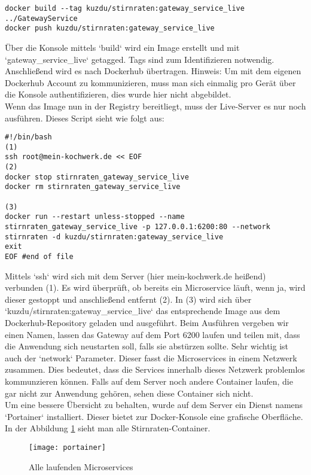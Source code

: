 \begin{verbatim}
docker build --tag kuzdu/stirnraten:gateway_service_live ../GatewayService
docker push kuzdu/stirnraten:gateway_service_live
\end{verbatim}

Über die Konsole mittels `build` wird ein Image erstellt und mit `gateway\_service\_live` getagged. Tags sind zum Identifizieren notwendig. Anschließend wird es nach Dockerhub übertragen. Hinweis: Um mit dem eigenen Dockerhub Account zu kommunizieren, muss man sich einmalig pro Gerät über die Konsole authentifizieren, dies wurde hier nicht abgebildet. \\

Wenn das Image nun in der Registry bereitliegt, muss der Live-Server es nur noch ausführen. Dieses Script sieht wie folgt aus:

\begin{verbatim}
#!/bin/bash
(1)
ssh root@mein-kochwerk.de << EOF 
(2)
docker stop stirnraten_gateway_service_live
docker rm stirnraten_gateway_service_live

(3)
docker run --restart unless-stopped --name stirnraten_gateway_service_live -p 127.0.0.1:6200:80 --network stirnraten -d kuzdu/stirnraten:gateway_service_live
exit
EOF #end of file
\end{verbatim}
Mittels `ssh` wird sich mit dem Server (hier mein-kochwerk.de heißend) verbunden (1). Es wird überprüft, ob bereits ein Microservice läuft, wenn ja, wird dieser gestoppt und anschließend entfernt (2). In (3) wird sich über `kuzdu/stirnraten:gateway\_service\_live` das entsprechende Image aus dem Dockerhub-Repository geladen und ausgeführt. Beim Ausführen vergeben wir einen Namen, lassen das Gateway auf dem Port 6200 laufen und teilen mit, dass die Anwendung sich neustarten soll, falls sie abstürzen sollte. Sehr wichtig ist auch der `network` Parameter. Dieser fasst die Microservices in einem Netzwerk zusammen. Dies bedeutet, dass die Services innerhalb dieses Netzwerk problemlos kommunzieren können. Falls auf dem Server noch andere Container laufen, die gar nicht zur Anwendung gehören, sehen diese Container sich nicht.\\

Um eine bessere Übersicht zu behalten, wurde auf dem Server ein Dienst namens `Portainer` installiert. Dieser bietet zur Docker-Konsole eine grafische Oberfläche. In der Abbildung \ref{fig:portainer} sieht man alle Stirnraten-Container.

\begin{figure}[ht]
	\centering
	\texttt{[image: portainer]}
	\caption[Alle laufenden Microservices] {Alle laufenden Microservices}
	\label{fig:portainer}
\end{figure} 





